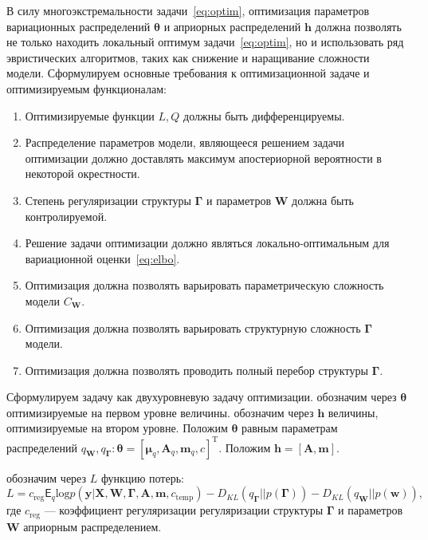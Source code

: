 В силу многоэкстремальности задачи~\eqref{eq:optim}, оптимизация параметров вариационных распределений $\boldsymbol{\theta}$ и априорных распределений $\mathbf{h}$ должна позволять не только находить локальный оптимум задачи~\eqref{eq:optim}, но и использовать ряд эвристических алгоритмов, таких как снижение и наращивание сложности модели. 
Сформулируем основные требования к оптимизационной задаче и оптимизируемым функционалам:
\begin{enumerate}
\item Оптимизируемые функции $L,Q$ должны быть дифференцируемы.
\item Распределение параметров модели, являющееся решением задачи оптимизации должно доставлять максимум апостериорной вероятности в некоторой окрестности.
\item Степень регуляризации структуры $\boldsymbol{\Gamma}$ и параметров $\mathbf{W}$ должна быть контролируемой.
\item Решение задачи оптимизации должно являться локально-оптимальным для вариационной оценки~\eqref{eq:elbo}.
\item Оптимизация должна позволять варьировать параметрическую сложность модели $C_{\mathbf{W}}$.
\item Оптимизация должна позволять варьировать структурную сложность ${\boldsymbol{\Gamma}}$ модели.
\item Оптимизация должна позволять проводить полный перебор структуры $\boldsymbol{\Gamma}$.
\end{enumerate}


Сформулируем задачу как двухуровневую задачу оптимизации. обозначим через  $\boldsymbol{\theta}$ оптимизируемые на первом уровне величины. обозначим через $\mathbf{h}$ величины, оптимизируемые на втором уровне.
Положим $\boldsymbol{\theta}$ равным параметрам распределений $q_{\mathbf{W}}, q_{\boldsymbol{\Gamma}}: \boldsymbol{\theta} = [\boldsymbol{\mu}_q, \mathbf{A}_q, \mathbf{m}_q, c]^\text{T}$.  
Положим $\mathbf{h} = [\mathbf{A}, \mathbf{m}].$

обозначим через $L$ функцию потерь:
\begin{equation}
    L = c_{\text{reg}}{\mathsf{E}_{q}}\text{log} p(\mathbf{y}|\mathbf{X},\mathbf{W}, \boldsymbol{\Gamma}, \mathbf{A},\mathbf{m}, c_{\text{temp}})
 - {D_{KL}}(q_{\boldsymbol{\Gamma}}||p(\boldsymbol{\Gamma})) - {D_{KL}}(q_{\mathbf{W}}||p(\mathbf{w})),
\end{equation}
где $c_{\text{reg}}$ --- коэффициент регуляризации регуляризации структуры $\boldsymbol{\Gamma}$ и параметров $\mathbf{W}$ априорным распределением.

